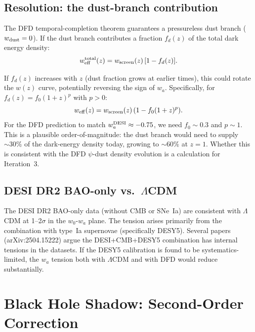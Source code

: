 \documentclass[11pt]{article}
\begin{document}
\subsection{Resolution: the dust-branch contribution}

The DFD temporal-completion theorem guarantees a pressureless dust
branch ($w_{\rm dust} = 0$).  If the dust branch contributes a fraction
$f_d(z)$ of the total dark energy density:
\begin{equation}
  w_{\rm eff}^{\rm total}(z) = w_{\rm screen}(z)\,[1 - f_d(z)].
\end{equation}

If $f_d(z)$ increases with $z$ (dust fraction grows at earlier times),
this could rotate the $w(z)$ curve, potentially reversing the sign of
$w_a$.  Specifically, for $f_d(z) = f_0(1+z)^p$ with $p > 0$:
\begin{equation}
  w_{\rm eff}(z) = w_{\rm screen}(z)\,(1 - f_0(1+z)^p).
\end{equation}
For the DFD prediction to match $w_a^{\rm DESI} \approx -0.75$,
we need $f_0 \sim 0.3$ and $p \sim 1$.  This is a plausible
order-of-magnitude: the dust branch would need to supply $\sim 30\%$
of the dark-energy density today, growing to $\sim 60\%$ at $z = 1$.
Whether this is consistent with the DFD $\psi$-dust density evolution
is a calculation for Iteration~3.

\subsection{DESI DR2 BAO-only vs.\ $\Lambda$CDM}

The DESI DR2 BAO-only data (without CMB or SNe~Ia) are consistent with
$\Lambda$CDM at 1--2$\sigma$ in the $w_0$-$w_a$ plane.  The tension
arises primarily from the combination with type~Ia supernovae (specifically
DESY5).  Several papers (arXiv:2504.15222) argue the DESI+CMB+DESY5
combination has internal tensions in the datasets.  If the DESY5
calibration is found to be systematics-limited, the $w_a$ tension both
with $\Lambda$CDM and with DFD would reduce substantially.

\section{Black Hole Shadow: Second-Order Correction}
\label{sec:shadow-2nd}
\end{document}
